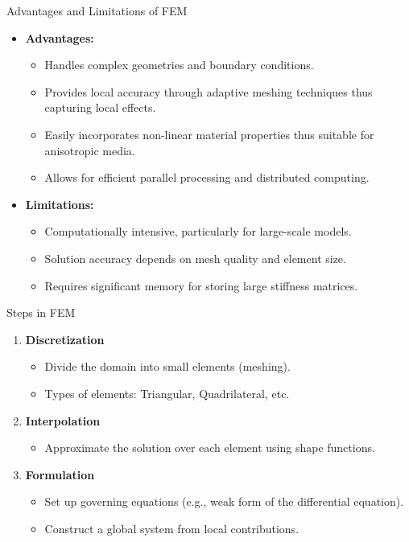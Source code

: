 \documentclass{beamer}
\begin{document}
\begin{frame}{Advantages and Limitations of FEM}
    \begin{itemize}
        \item \textbf{Advantages:}
        \begin{itemize}
            \item Handles complex geometries and boundary conditions.
            \item Provides local accuracy through adaptive meshing techniques thus capturing local effects.
            \item Easily incorporates non-linear material properties thus suitable for anisotropic media.
            \item Allows for efficient parallel processing and distributed computing.
        \end{itemize}
        \item \textbf{Limitations:}
        \begin{itemize}
            \item Computationally intensive, particularly for large-scale models.
            \item Solution accuracy depends on mesh quality and element size.
            \item Requires significant memory for storing large stiffness matrices.
        \end{itemize}
    \end{itemize}
\end{frame}


\begin{frame}{Steps in FEM}
    \begin{enumerate}
        \item \textbf{Discretization}
        \begin{itemize}
            \item Divide the domain into small elements (meshing).
            \item Types of elements: Triangular, Quadrilateral, etc.
        \end{itemize}
        \item \textbf{Interpolation}
        \begin{itemize}
            \item Approximate the solution over each element using shape functions.
        \end{itemize}
        \item \textbf{Formulation}
        \begin{itemize}
            \item Set up governing equations (e.g., weak form of the differential equation).
            \item Construct a global system from local contributions.
        \end{itemize}
    \end{enumerate}
\end{frame}
\end{document}
